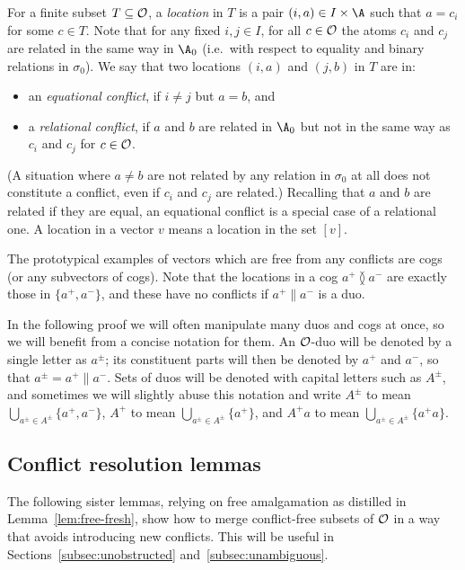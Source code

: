 For a finite subset $T \subseteq \cal O$, a {\em location} in $T$ is a pair $(i,a)\in I\times\A$ such that $a=c_i$ for some $c\in T$. 
Note that for any fixed $i,j\in I$, for all $c\in\cal O$ the atoms $c_i$ and $c_j$ are related in the same way in $\A_0$ (i.e.~with respect to equality and binary relations in $\sigma_0$). We say that two locations $(i,a)$ and $(j,b)$ in $T$ are in:
\begin{itemize}
\item an {\em equational conflict}, if $i\neq j$ but $a=b$, and
\item a {\em relational conflict}, if $a$ and $b$ are related in $\A_0$ but not in the same way as $c_i$ and $c_j$ for $c\in\cal O$.
\end{itemize}
(A situation where $a \neq b$ are not related by any relation in $\sigma_0$ at all does not constitute a conflict, even if $c_i$ and $c_j$ are related.) 
Recalling that $a$ and $b$ are related if they are equal, an equational conflict is a special case of a relational one.
A location in a vector $v$ means a location in the set $[v]$.

The prototypical examples of vectors which are free from any conflicts are cogs (or any subvectors of cogs). Note that the locations in a cog $a^+ \between a^-$ are exactly those in $\{a^+ ,a^-\}$, and these have no conflicts if $a^+ \parallel a^-$ is a duo.

In the following proof we will often manipulate many duos and cogs at once, so we will benefit from a concise notation for them. 
An $\cal O$-duo will be denoted by a single letter as $a^\pm$; its constituent parts will then be denoted by $a^+$ and $a^-$, so that $a^\pm=a^+\parallel a^-$. Sets of duos will be denoted with capital letters such as $A^\pm$, and sometimes we will slightly abuse this notation and write $A^\pm$ to mean $\bigcup_{a^\pm\in A^\pm}\{a^+,a^-\}$,
$A^+$ to mean $\bigcup_{a^\pm\in A^\pm}\{a^+\}$, 
and $A^+ a$ to mean $\bigcup_{a^\pm\in A^\pm}\{a^+ a\}$.

\subsection{Conflict resolution lemmas}
The following sister lemmas, relying on free amalgamation as distilled in Lemma~\ref{lem:free-fresh}, show how to merge conflict-free subsets of $\cal O$ in a way that avoids introducing new conflicts. This will be useful in Sections~\ref{subsec:unobstructed} and~\ref{subsec:unambiguous}.

